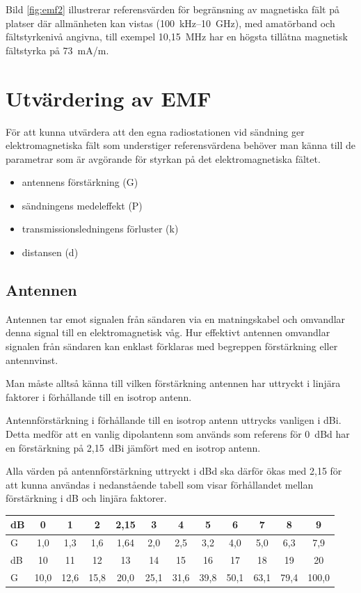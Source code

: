 Bild \ref{fig:emf2} illustrerar referensvärden för begränsning av magnetiska
fält på platser där allmänheten kan vistas (100~kHz--10~GHz), med amatörband
och fältstyrkenivå angivna, till exempel 10,15~MHz har en högsta tillåtna
magnetisk fältstyrka på 73~mA/m.

\section{Utvärdering av EMF}

För att kunna utvärdera att den egna radiostationen vid sändning ger
elektromagnetiska fält som understiger referensvärdena behöver man känna till
de parametrar som är avgörande för styrkan på det elektromagnetiska fältet.
\begin{itemize}
	\item antennens förstärkning (G)
	\item sändningens medeleffekt (P)
	\item transmissionsledningens förluster (k)
	\item distansen (d)
\end{itemize}

\subsection{Antennen}
Antennen tar emot signalen från sändaren via en matningskabel och
omvandlar denna signal till en elektromagnetisk våg.
Hur effektivt antennen omvandlar signalen från sändaren kan enklast förklaras
med begreppen förstärkning eller antennvinst.

Man måste alltså känna till vilken förstärkning antennen har uttryckt i linjära
faktorer i förhållande till en isotrop antenn.

Antennförstärkning i förhållande till en isotrop antenn uttrycks vanligen i dBi.
Detta medför att en vanlig dipolantenn som används som referens för 0~dBd har
en förstärkning på 2,15~dBi jämfört med en isotrop antenn.

Alla värden på antennförstärkning uttryckt i dBd ska därför ökas med 2,15 för
att kunna användas i nedanstående tabell som visar förhållandet mellan
förstärkning i dB och linjära faktorer. 

\begin{tabular}{|l|ccccccccccc|}
	\hline
	dB     &  0  &  1  &  2 & 2,15 &  3  &  4  &  5  &  6  &  7  &  8  &  9  \\ \hline
	G & 1,0 & 1,3 & 1,6 & 1,64 & 2,0 & 2,5 & 3,2 & 4,0 & 5,0 & 6,3 & 7,9 \\ \hline
	dB     &  10  &  11  &  12  &  13  &  14  &  15  &  16  &  17  &  18  &  19  &  20 \\ \hline
	G & 10,0 & 12,6 & 15,8 & 20,0 & 25,1 & 31,6 & 39,8 & 50,1 & 63,1 & 79,4 & 100,0 \\ \hline
\end{tabular}

